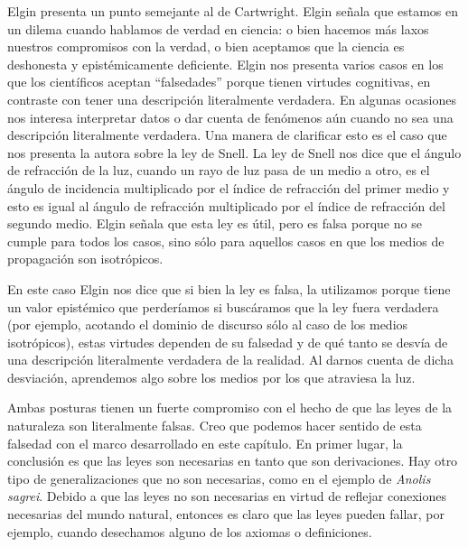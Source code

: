 Elgin presenta un punto semejante al de Cartwright. Elgin \citeyear{Elgin2004} señala que estamos en un dilema cuando hablamos de verdad en ciencia: o bien hacemos más laxos nuestros compromisos con la verdad, o bien aceptamos que la ciencia es deshonesta y epistémicamente deficiente. Elgin nos presenta varios casos en los que los científicos aceptan ``falsedades'' porque tienen virtudes cognitivas, en contraste con tener una descripción literalmente verdadera. En algunas ocasiones nos interesa interpretar datos o dar cuenta de fenómenos aún cuando no sea una descripción literalmente verdadera. Una manera de clarificar esto es el caso que nos presenta la autora sobre la ley de Snell. La ley de Snell nos dice que el ángulo de refracción de la luz, cuando un rayo de luz pasa de un medio a otro, es el ángulo de incidencia multiplicado por el índice de refracción del primer medio y esto es igual al ángulo de refracción multiplicado por el índice de refracción del segundo medio. Elgin señala que esta ley es útil, pero es falsa porque no se cumple para todos los casos, sino sólo para aquellos casos en que los medios de propagación son isotrópicos.

En este caso Elgin nos dice que si bien la ley es falsa, la utilizamos porque tiene un valor epistémico que perderíamos si buscáramos que la ley fuera verdadera (por ejemplo, acotando el dominio de discurso sólo al caso de los medios isotrópicos), estas virtudes dependen de su falsedad y de qué tanto se desvía de una descripción literalmente verdadera de la realidad. Al darnos cuenta de dicha desviación, aprendemos algo sobre los medios por los que atraviesa la luz.

Ambas posturas tienen un fuerte compromiso con el hecho de que las leyes de la naturaleza son literalmente falsas. Creo que podemos hacer sentido de esta falsedad con el marco desarrollado en este capítulo. En primer lugar, la conclusión es que las leyes son necesarias en tanto que son derivaciones. Hay otro tipo de generalizaciones que no son necesarias, como en el ejemplo de \emph{Anolis sagrei}. Debido a que las leyes no son necesarias en virtud de reflejar conexiones necesarias del mundo natural, entonces es claro que las leyes pueden fallar, por ejemplo, cuando desechamos alguno de los axiomas o definiciones.

